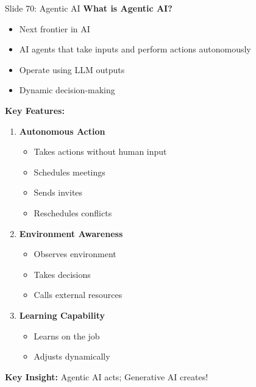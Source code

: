 \documentclass[8pt]{beamer}
\begin{document}
	\begin{frame}{Slide 70: Agentic AI}
		\fontsize{6.5}{7.5}\selectfont
		\textbf{What is Agentic AI?}
		\begin{itemize}
			\item Next frontier in AI
			\item AI agents that take inputs and perform actions autonomously
			\item Operate using LLM outputs
			\item Dynamic decision-making
		\end{itemize}
		
		\vspace{0.1cm}
		\textbf{Key Features:}
		\begin{enumerate}
			\item \textbf{Autonomous Action}
			\begin{itemize}
				\item Takes actions without human input
				\item Schedules meetings
				\item Sends invites
				\item Reschedules conflicts
			\end{itemize}
			\item \textbf{Environment Awareness}
			\begin{itemize}
				\item Observes environment
				\item Takes decisions
				\item Calls external resources
			\end{itemize}
			\item \textbf{Learning Capability}
			\begin{itemize}
				\item Learns on the job
				\item Adjusts dynamically
			\end{itemize}
		\end{enumerate}
		
		\textcolor{myblue}{\textbf{Key Insight:}} Agentic AI acts; Generative AI creates!
	\end{frame}
	
	
\end{document}
